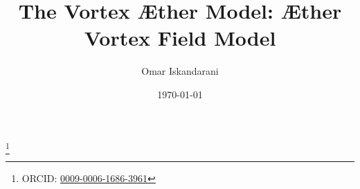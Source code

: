 \documentclass[aps,preprint,superscriptaddress]{revtex4}
\begin{document}
\sloppy
\author{Omar Iskandarani}
\title{The Vortex Æther Model: Æther Vortex Field Model}
\date{\today}
\thanks{ORCID: \href{https://orcid.org/0009-0006-1686-3961}{0009-0006-1686-3961}}














\appendix \label{sec:Part-6}
\label{appendix:1}
\label{appendix:2}
\end{document}
